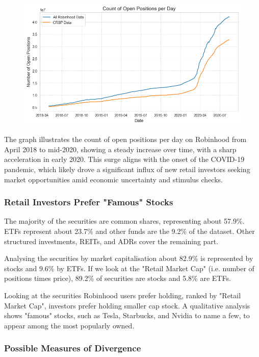 \begin{figure}[h!]
        \centering
        \includegraphics[width=0.8\linewidth]{Images/no_positions_vs_date_drop.png}
\end{figure}

The graph illustrates the  count of open positions per day  on Robinhood from April 2018 to mid-2020, showing a  steady increase  over time, with a  sharp acceleration in early 2020. This surge aligns with the onset of the  COVID-19 pandemic, which likely drove a significant influx of new retail investors seeking market opportunities amid economic uncertainty and stimulus checks. 



\subsubsection{Retail Investors Prefer "Famous" Stocks}

The majority of the securities are common shares, representing about 57.9\%. ETFs represent about 23.7\% and other funds are the 9.2\% of the dataset. Other structured investments, REITs, and ADRs cover the remaining part.

Analysing the securities by market capitalisation about 82.9\% is represented by stocks and 9.6\% by ETFs. If we look at the "Retail Market Cap" (i.e. number of positions times price), 89.2\% of securities are stocks and 5.8\% are ETFs.  

Looking at the securities Robinhood users prefer holding, ranked by "Retail Market Cap", investors prefer holding smaller cap stock. A qualitative analysis shows "famous" stocks, such as Tesla, Starbucks, and Nvidia to name a few, to appear among the most popularly owned.

\subsubsection{Possible Measures of Divergence} 
